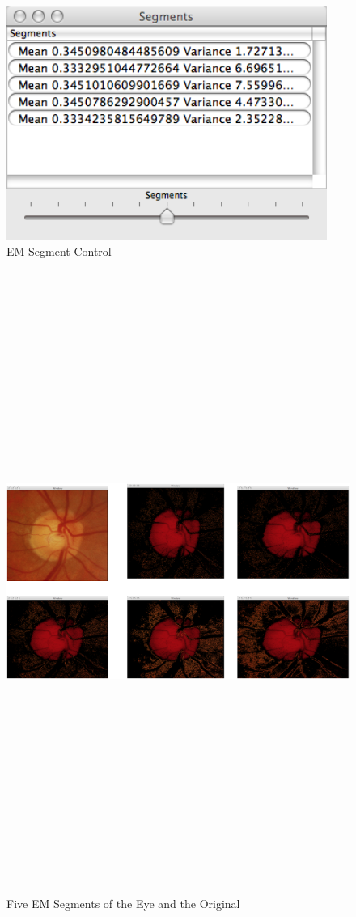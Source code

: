 \documentclass[]{article}
\begin{document}
\begin{figure}[htbp]
	\centering
		\includegraphics[height=3in]{segmentsPanel.png}
	\caption{EM Segment Control}
	\label{fig:segmentsPanel}
\end{figure}

\begin{figure}[htbp]
	\centering
		\includegraphics[angle=90,height=8in]{fiveEmSegments.png}
	\caption{Five EM Segments of the Eye and the Original}
	\label{fig:fiveEmSegments}
\end{figure}
\end{document}
